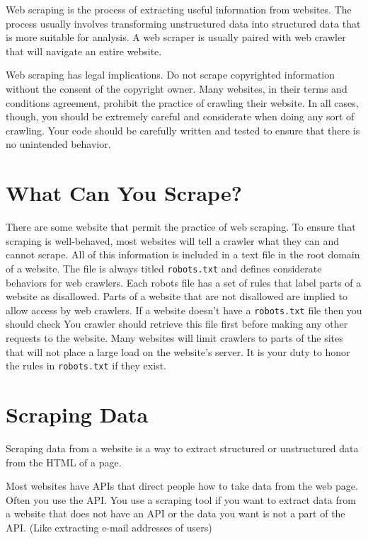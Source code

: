 
Web scraping is the process of extracting useful information from websites.
The process usually involves transforming unstructured data into structured data that is more 
suitable for analysis.
A web scraper is usually paired with web crawler that will navigate an entire website.

\begin{warn}
Web scraping has legal implications.
Do not scrape copyrighted information without the consent of the copyright owner.
Many websites, in their terms and conditions agreement, prohibit the practice of crawling their 
website.
In all cases, though, you should be extremely careful and considerate when doing any sort of 
crawling.
Your code should be carefully written and tested to ensure that there is no unintended behavior.
\end{warn}

\section*{What Can You Scrape?}
There are some website that permit the practice of web scraping.
To ensure that scraping is well-behaved, most websites will tell a crawler what they can and cannot 
scrape.
All of this information is included in a text file in the root domain of a website.
The file is always titled \texttt{robots.txt} and defines considerate behaviors for web crawlers.
Each robots file has a set of rules that label parts of a website as disallowed.
Parts of a website that are not disallowed are implied to allow access by web crawlers.
If a website doesn't have a \texttt{robots.txt} file then you should check
You crawler should retrieve this file first before making any other requests to the website.
Many websites will limit crawlers to parts of the sites that will not place a large load on the 
website's server.
It is your duty to honor the rules in \texttt{robots.txt} if they exist.

\section*{Scraping Data}
Scraping data from a website is a way to extract structured or unstructured data from the HTML of a page.

Most websites have APIs that direct people how to take data from the web page. 
Often you use the API. 
You use a scraping tool if you want to extract data from a website that does not have an API or the data you want is not a part of the API.
 (Like extracting e-mail addresses of users)

